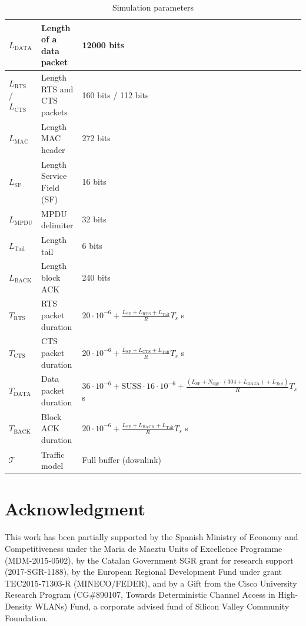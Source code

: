 \documentclass[preprint,12pt]{elsarticle}
\begin{document}
\begin{table}[h!]
{\begin{tabular}{|l|l|l|}
		$L_{\text{DATA}}$ & Length of a data packet & 12000 bits \\ \hline
		$L_{\text{RTS}}$ / $L_{\text{CTS}}$ & Length RTS and CTS packets & 160 bits / 112 bits \\ \hline
		$L_{\text{MAC}}$ & Length MAC header & 272 bits \\ \hline
		$L_{\text{SF}}$ & Length Service Field (SF) & 16 bits \\ \hline
		$L_{\text{MPDU}}$ & MPDU delimiter & 32 bits \\ \hline
		$L_{\text{Tail}}$ & Length tail & 6 bits \\ \hline
		$L_{\text{BACK}}$ & Length block ACK & 240 bits \\ \hline	
		$T_{\text{RTS}}$ & RTS packet duration & $20\cdot 10^{-6} + \frac{L_{\text{SF}}+L_{\text{RTS}}+L_{\text{Tail}}}{R}T_s$ s\\ \hline	
		$T_{\text{CTS}}$ & CTS packet duration & $20\cdot 10^{-6} + \frac{L_{\text{SF}}+L_{\text{CTS}}+L_{\text{Tail}}}{R}T_s$ s \\ \hline	
		$T_{\text{DATA}}$ & Data packet duration & $36\cdot 10^{-6} + \text{SUSS} \cdot 16 \cdot 10^{-6} + \frac{(L_{\text{SF}}+N_{agg}\cdot(304+L_{\text{DATA}})+L_{Tail})}{R}T_s$ s \\ \hline	
		$T_{\text{BACK}}$ & Block ACK duration & $20 \cdot 10^{-6} + \frac{L_{\text{SF}}+L_{\text{BACK}}+L_{\text{Tail}}}{R}T_s $ s\\ \hline	
		$\mathcal{T}$ & Traffic model & Full buffer (downlink) \\ \hline	
	\end{tabular}}
	\caption{Simulation parameters}
	\label{tbl:simulation_parameters}
\end{table}		

\section*{Acknowledgment}
This work has been partially supported by the Spanish Ministry of Economy and Competitiveness under the Maria de Maeztu Units of Excellence Programme (MDM-2015-0502), by the Catalan Government SGR grant for research support (2017-SGR-1188), by the European Regional Development Fund under grant TEC2015-71303-R (MINECO/FEDER), and by a Gift from the Cisco University Research Program (CG\#890107, Towards Deterministic Channel Access in High-Density WLANs) Fund, a corporate advised fund of Silicon Valley Community Foundation.

\newpage


\end{document}
